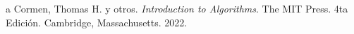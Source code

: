 \documentclass[10pt]{article} %
\begin{document}
%    
%    
%    
%	
	
	\begin{thebibliography}
		a
		 Cormen, Thomas H. y otros. \emph{Introduction to Algorithms}. 
		The MIT Press.
		4ta Edici\'on.		
		Cambridge, Massachusetts.
		2022.
	\end{thebibliography}
\end{document}
